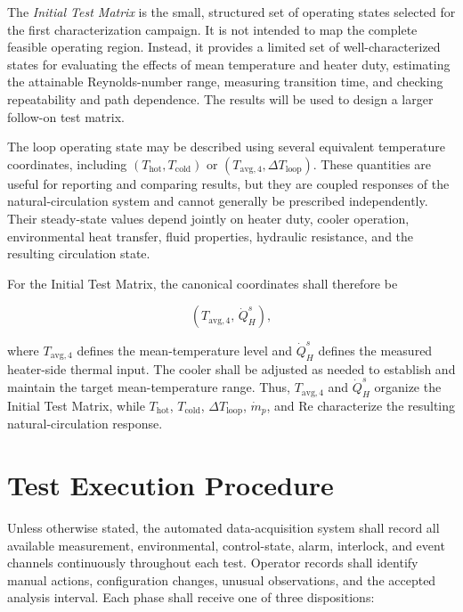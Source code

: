 \documentclass[11pt]{article}
\newcommand{\Tavg}{T_{\mathrm{avg},4}}
\newcommand{\Thot}{T_{\mathrm{hot}}}
\newcommand{\Tcold}{T_{\mathrm{cold}}}
\newcommand{\QHs}{\dot Q_{H}^{s}}
\newcommand{\mdotp}{\dot m_{p}}
\newcommand{\Rey}{\mathrm{Re}}
\begin{document}
The \emph{Initial Test Matrix} is the small, structured set of operating states selected for the first characterization campaign. It is not intended to map the complete feasible operating region. Instead, it provides a limited set of well-characterized states for evaluating the effects of mean temperature and heater duty, estimating the attainable Reynolds-number range, measuring transition time, and checking repeatability and path dependence. The results will be used to design a larger follow-on test matrix.

The loop operating state may be described using several equivalent temperature coordinates, including $(\Thot,\Tcold)$ or $(\Tavg,\Delta T_{\mathrm{loop}})$. These quantities are useful for reporting and comparing results, but they are coupled responses of the natural-circulation system and cannot generally be prescribed independently. Their steady-state values depend jointly on heater duty, cooler operation, environmental heat transfer, fluid properties, hydraulic resistance, and the resulting circulation state.

For the Initial Test Matrix, the canonical coordinates shall therefore be

\begin{equation}
    \left(\Tavg,\,\QHs\right),
\end{equation}

where $\Tavg$ defines the mean-temperature level and $\QHs$ defines the measured heater-side thermal input. The cooler shall be adjusted as needed to establish and maintain the target mean-temperature range. Thus, $\Tavg$ and $\QHs$ organize the Initial Test Matrix, while $\Thot$, $\Tcold$, $\Delta T_{\mathrm{loop}}$, $\mdotp$, and $\Rey$ characterize the resulting natural-circulation response.

\clearpage
\section{Test Execution Procedure}
\label{sec:test_procedure}

Unless otherwise stated, the automated data-acquisition system shall record all available measurement, environmental, control-state, alarm, interlock, and event channels continuously throughout each test. Operator records shall identify manual actions, configuration changes, unusual observations, and the accepted analysis interval. Each phase shall receive one of three dispositions:
\end{document}
